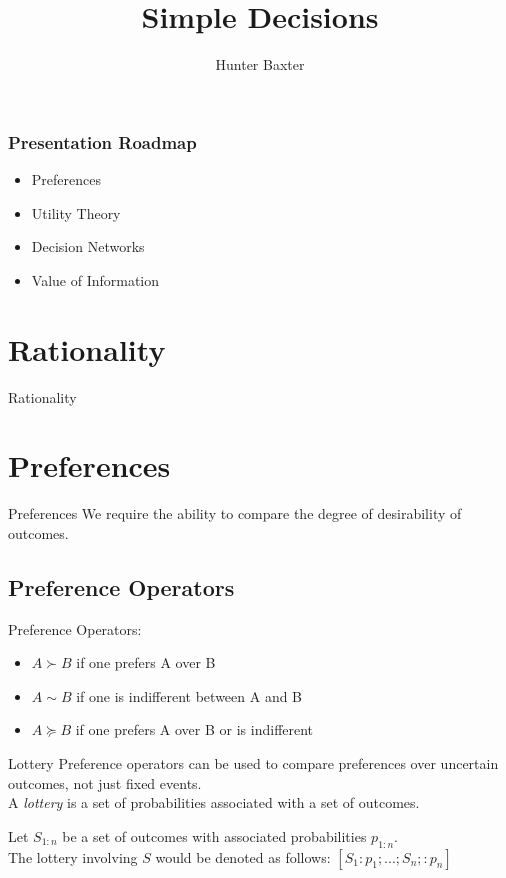 \documentclass{beamer}
\title{Simple Decisions}
\author{Hunter Baxter}
\begin{document}
\maketitle

\begin{frame}
\frametitle{Presentation Roadmap}
\begin{itemize}
    \item Preferences
    \item Utility Theory 
    \item Decision Networks
    \item Value of Information
\end{itemize}
\end{frame}

\section{Rationality}
\begin{frame}{Rationality}
\end{frame}

\section{Preferences}
\begin{frame}{Preferences}
We require the ability to compare the degree of desirability of outcomes.

\subsection{Preference Operators}
Preference Operators:
\begin{itemize}
    \item $A \succ B$ if one prefers A over B
    \item $A \sim B$ if one is indifferent between A and B
    \item $A \succeq B$ if one prefers A over B or is indifferent
\end{itemize}
\end{frame}

\begin{frame}{Lottery}
Preference operators can be used to compare preferences over uncertain outcomes, not just fixed events. \\
A \textit{lottery} is a set of probabilities associated with a set of outcomes.

Let $S_{1:n}$ be a set of outcomes with associated probabilities $p_{1:n}$. \\

The lottery involving $S$ would be denoted as follows:
$[S_1:p_1;...;S_n;:p_n]$

\end{frame}
\end{document}
